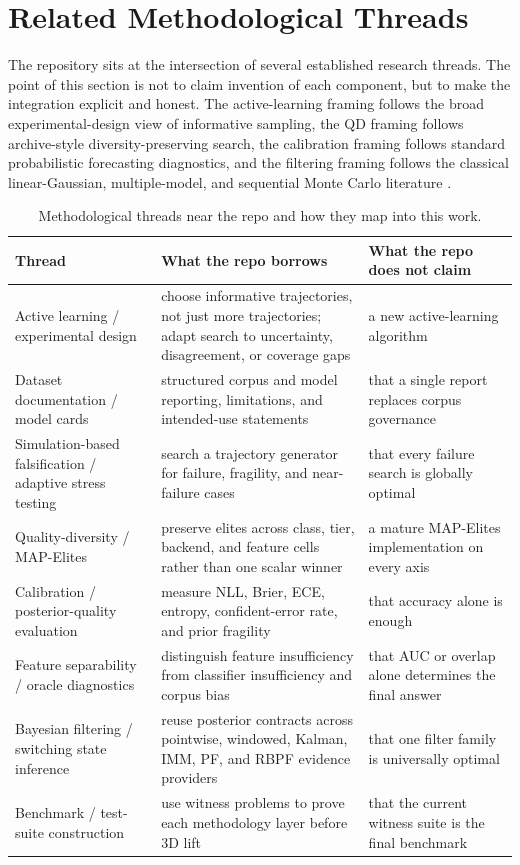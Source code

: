 \documentclass[11pt]{article}
\begin{document}
\section{Related Methodological Threads}
The repository sits at the intersection of several established research threads. The point of this section is not to claim invention of each component, but to make the integration explicit and honest. The active-learning framing follows the broad experimental-design view of informative sampling, the QD framing follows archive-style diversity-preserving search, the calibration framing follows standard probabilistic forecasting diagnostics, and the filtering framing follows the classical linear-Gaussian, multiple-model, and sequential Monte Carlo literature \cite{settles2009,deb2002,mouret2015,brier1950,niculescu2005,guo2017,kalman1960,barshalom2001,doucet2001}.

\begin{table}[htbp]
\centering
\small
\setlength{\tabcolsep}{4pt}
\caption{Methodological threads near the repo and how they map into this work.}
\label{tab:related_methodological_threads}
\begin{tabularx}{\textwidth}{>{\raggedright\arraybackslash}p{}XX}
\toprule
Thread & What the repo borrows & What the repo does not claim \\
\midrule
Active learning / experimental design & choose informative trajectories, not just more trajectories; adapt search to uncertainty, disagreement, or coverage gaps & a new active-learning algorithm \\
Dataset documentation / model cards & structured corpus and model reporting, limitations, and intended-use statements & that a single report replaces corpus governance \\
Simulation-based falsification / adaptive stress testing & search a trajectory generator for failure, fragility, and near-failure cases & that every failure search is globally optimal \\
Quality-diversity / MAP-Elites & preserve elites across class, tier, backend, and feature cells rather than one scalar winner & a mature MAP-Elites implementation on every axis \\
Calibration / posterior-quality evaluation & measure NLL, Brier, ECE, entropy, confident-error rate, and prior fragility & that accuracy alone is enough \\
Feature separability / oracle diagnostics & distinguish feature insufficiency from classifier insufficiency and corpus bias & that AUC or overlap alone determines the final answer \\
Bayesian filtering / switching state inference & reuse posterior contracts across pointwise, windowed, Kalman, IMM, PF, and RBPF evidence providers & that one filter family is universally optimal \\
Benchmark / test-suite construction & use witness problems to prove each methodology layer before 3D lift & that the current witness suite is the final benchmark \\
\bottomrule
\end{tabularx}
\end{table}
\end{document}
